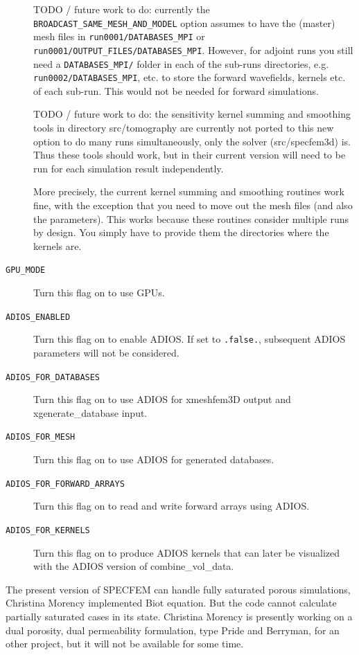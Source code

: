 \begin{description}
TODO / future work to do: currently the \texttt{BROADCAST\_SAME\_MESH\_AND\_MODEL}
option assumes to have the (master) mesh files in \texttt{run0001/DATABASES\_MPI} or
\texttt{run0001/OUTPUT\_FILES/DATABASES\_MPI}.
However, for adjoint runs you still need a \texttt{DATABASES\_MPI/} folder in each of the sub-runs directories,
e.g. \texttt{run0002/DATABASES\_MPI}, etc. to store the forward wavefields, kernels etc. of each sub-run.
This would not be needed for forward simulations.

TODO / future work to do: the sensitivity kernel summing and smoothing tools in directory src/tomography are currently not ported to this new option to do many runs simultaneously, only the solver (src/specfem3d) is. Thus these tools should work, but in their current version will need to be run for each simulation result independently.

More precisely, the current kernel summing and smoothing routines work fine, with the exception that you need to move out the mesh files (and also the parameters). This works because these routines consider multiple runs by design. You simply have to provide them the directories where the kernels are.

\item [{\texttt{GPU\_MODE}}] Turn this flag on to use GPUs.

\item [\texttt{ADIOS\_ENABLED}] Turn this flag on to enable ADIOS. If set to \texttt{.false.}, subsequent ADIOS
parameters will not be considered.
\item [\texttt{ADIOS\_FOR\_DATABASES}] Turn this flag on to use ADIOS for xmeshfem3D output and
xgenerate\_database input.
\item [\texttt{ADIOS\_FOR\_MESH}]  Turn this flag on to use ADIOS for generated databases.
\item [\texttt{ADIOS\_FOR\_FORWARD\_ARRAYS}] Turn this flag on to read and write forward arrays using ADIOS.
\item [\texttt{ADIOS\_FOR\_KERNELS}] Turn this flag on to produce ADIOS kernels that can later be visualized with the ADIOS version of combine\_vol\_data.

\end{description}

The present version of SPECFEM can handle fully saturated porous simulations, Christina Morency implemented Biot equation.
But the code cannot calculate partially saturated cases in its state.
Christina Morency is presently working on a dual porosity, dual permeability formulation, type Pride and Berryman, for an other project, but it will not be available for some time.\\


